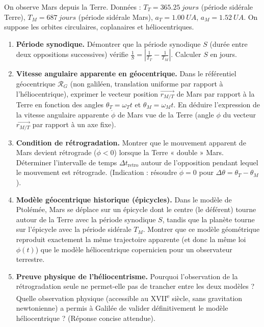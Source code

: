 \documentclass[11pt]{article}
\begin{document}
\begin{exercice}
On observe Mars depuis la Terre. Données : $T_T = \SI{365.25}{jours}$ (période sidérale Terre), $T_M = \SI{687}{jours}$ (période sidérale Mars), $a_T = \SI{1.00}{UA}$, $a_M = \SI{1.52}{UA}$. On suppose les orbites circulaires, coplanaires et héliocentriques.
\begin{enumerate}
    \item \textbf{Période synodique.} Démontrer que la période synodique $S$ (durée entre deux oppositions successives) vérifie $\frac{1}{S} = \left| \frac{1}{T_T} - \frac{1}{T_M} \right|$. Calculer $S$ en jours.
    \item \textbf{Vitesse angulaire apparente en géocentrique.} Dans le référentiel géocentrique $\mathcal{R}_G$ (non galiléen, translation uniforme par rapport à l'héliocentrique), exprimer le vecteur position $\overrightarrow{r_{M/T}}$ de Mars par rapport à la Terre en fonction des angles $\theta_T = \omega_T t$ et $\theta_M = \omega_M t$. En déduire l'expression de la vitesse angulaire apparente $\dot{\phi}$ de Mars vue de la Terre (angle $\phi$ du vecteur $\overrightarrow{r_{M/T}}$ par rapport à un axe fixe).
    \item \textbf{Condition de rétrogradation.} Montrer que le mouvement apparent de Mars devient rétrograde ($\dot{\phi} < 0$) lorsque la Terre « double » Mars. Déterminer l'intervalle de temps $\Delta t_{\text{retro}}$ autour de l'opposition pendant lequel le mouvement est rétrograde. (Indication : résoudre $\dot{\phi} = 0$ pour $\Delta \theta = \theta_T - \theta_M$).
    \item \textbf{Modèle géocentrique historique (épicycles).} Dans le modèle de Ptolémée, Mars se déplace sur un épicycle dont le centre (le déférent) tourne autour de la Terre avec la période synodique $S$, tandis que la planète tourne sur l'épicycle avec la période sidérale $T_M$. Montrer que ce modèle géométrique reproduit exactement la même trajectoire apparente (et donc la même loi $\phi(t)$) que le modèle héliocentrique copernicien pour un observateur terrestre.
    \item \textbf{Preuve physique de l'héliocentrisme.} Pourquoi l'observation de la rétrogradation seule ne permet-elle pas de trancher entre les deux modèles ? Quelle observation physique (accessible au XVII\textsuperscript{e} siècle, sans gravitation newtonienne) a permis à Galilée de valider définitivement le modèle héliocentrique ? (Réponse concise attendue).
\end{enumerate}
\end{exercice}
\end{document}
